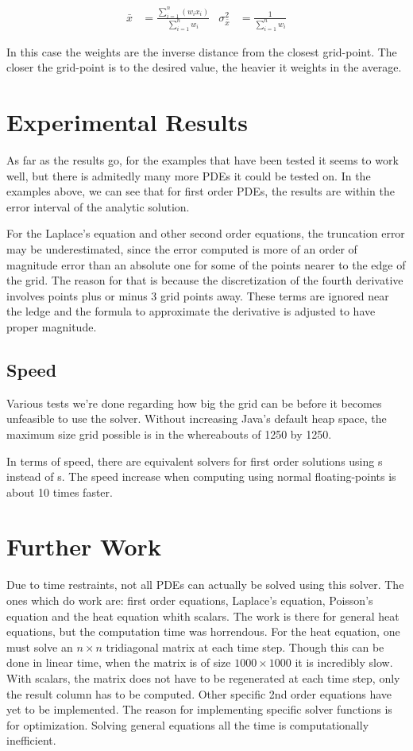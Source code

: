\begin{align*}
    \bar{x} & = \frac{\sum_{i=1}^n(w_ix_i)}{\sum_{i=1}^n w_i}&
    \sigma^2_{\bar{x}}& = \frac{1}{\sum_{i=1}^n w_i}
\end{align*}

In this case the weights are the inverse distance from the closest
grid-point. The closer the grid-point is to the desired value, the
heavier it weights in the average.
\section{Experimental Results}
As far as the results go, for the examples that have been tested it
seems to work well, but there is admitedly many more PDEs it could be
tested on. In the examples above, we can see that for first order
PDEs, the results are within the error interval of the analytic
solution.

For
the Laplace's equation and other second order equations, the
truncation error may be underestimated, since the error computed is
more of an order of magnitude error than an absolute one for some of
the points nearer to the edge of the grid. The reason for that is
because the discretization of the fourth derivative involves points
plus or minus 3 grid points away. These terms are ignored near the
ledge and the formula to approximate the derivative is adjusted to
have proper magnitude.

\subsection{Speed}
Various tests we're done regarding how big the grid can be before it
becomes unfeasible to use the solver. Without increasing Java's
default heap space, the maximum size grid possible is in the
whereabouts of 1250 by 1250.

In terms of speed, there are equivalent solvers for first order
solutions using s instead of s. The
speed increase when computing using normal floating-points is about 10
times faster.

\section{Further Work}
Due to time restraints, not all PDEs can actually be solved using this
solver. The ones which do work are: first order equations, Laplace's
equation, Poisson's equation and the heat equation whith scalars. The
work is there for general heat equations, but the computation time was
horrendous. For the heat equation, one must solve an $n\times n$
tridiagonal matrix at each time step. Though this can be done in
linear time, when the matrix is of size $1000\times1000$ it is
incredibly slow. With scalars, the matrix does not have to be
regenerated at each time step, only the result column has to be
computed. Other specific 2nd order equations have yet to be
implemented. The reason for implementing specific solver functions is
for optimization. Solving general equations all the time is
computationally inefficient.

